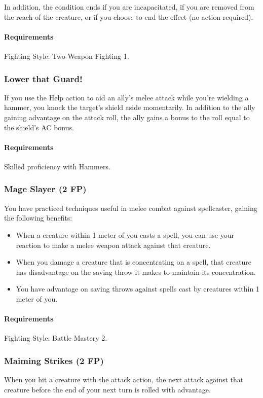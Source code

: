     In addition, the condition ends if you are incapacitated, if you are removed from the reach of the creature, or if you choose to end the effect (no action required).
    \paragraph{Requirements} Fighting Style: Two-Weapon Fighting 1.
\subsubsection{Lower that Guard!} \label{feat::lowerthatguard}
    If you use the Help action to aid an ally's melee attack while you're wielding a hammer, you knock the target's shield aside momentarily.
    In addition to the ally gaining advantage on the attack roll, the ally gains a bonus to the roll equal to the shield's AC bonus.
    \paragraph{Requirements} Skilled proficiency with Hammers.
\subsubsection{Mage Slayer (2 FP)} \label{feat::mageslayer}
    You have practiced techniques useful in melee combat against spellcaster, gaining the following benefits:
    \begin{itemize}
        \item When a creature within 1 meter of you casts a spell, you can use your reaction to make a melee weapon attack against that creature.
        \item When you damage a creature that is concentrating on a spell, that creature has disadvantage on the saving throw it makes to maintain its concentration.
        \item You have advantage on saving throws against spells cast by creatures within 1 meter of you.
    \end{itemize}
    \paragraph{Requirements} Fighting Style: Battle Mastery 2.
\subsubsection{Maiming Strikes (2 FP)} \label{feat::maimingstrikes}
    When you hit a creature with the attack action, the next attack against that creature before the end of your next turn is rolled with advantage.
